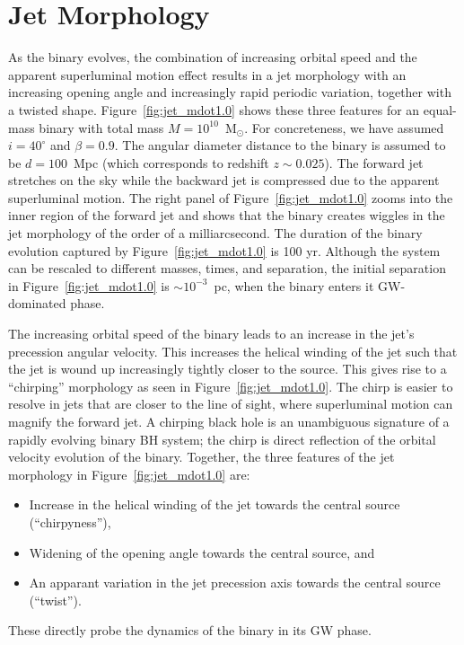 \documentclass[a4paper,fleqn,usenatbib]{mnras}
\begin{document}
\section{Jet Morphology}

As the binary evolves, the combination of increasing orbital speed and
the apparent superluminal motion effect results in a jet morphology
with an increasing opening angle and increasingly rapid periodic
variation, together with a twisted shape.
Figure~\ref{fig:jet_mdot1.0} shows these three features for an
equal-mass binary with total mass $M=10^{10}$~M$_\odot$.  For
concreteness, we have assumed $i=40^\circ$ and $\beta=0.9$.  The
angular diameter distance to the binary is assumed to be $d = 100$~Mpc
(which corresponds to redshift $z\sim 0.025$).  The forward jet
stretches on the sky while the backward jet is compressed due to the
apparent superluminal motion.  The right panel of
Figure~\ref{fig:jet_mdot1.0} zooms into the inner region of the
forward jet and shows that the binary creates wiggles in the jet
morphology of the order of a milliarcsecond.  The duration of the
binary evolution captured by Figure~\ref{fig:jet_mdot1.0} is 100 yr.
Although the system can be rescaled to different masses, times, and
separation, the initial separation in Figure~\ref{fig:jet_mdot1.0} is
$\sim 10^{-3}$~pc, when the binary enters it GW-dominated phase.

The increasing orbital speed of the binary leads to an increase in the
jet's precession angular velocity.  This increases the helical winding
of the jet such that the jet is wound up increasingly tightly closer
to the source.  This gives rise to a ``chirping'' morphology as seen
in Figure~\ref{fig:jet_mdot1.0}.  The chirp is easier to resolve in
jets that are closer to the line of sight, where superluminal motion
can magnify the forward jet.  A chirping black hole is an unambiguous
signature of a rapidly evolving binary BH system; the chirp is direct
reflection of the orbital velocity evolution of the binary. Together,
the three features of the jet morphology in
Figure~\ref{fig:jet_mdot1.0} are:
\begin{itemize}
\item Increase in the helical winding of the jet towards the central source (``chirpyness''),
\item Widening of the opening angle towards the central source, and 
\item An apparant variation in the jet precession axis towards the central source (``twist''). 
\end{itemize}
These directly probe the dynamics of the binary in its GW phase.
\end{document}
